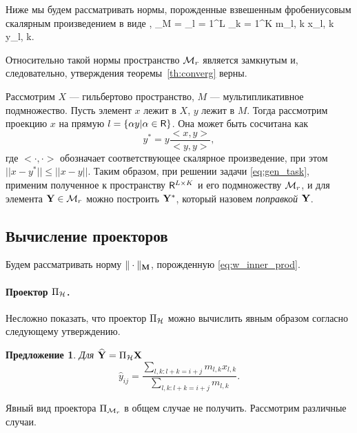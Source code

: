 \documentclass[12pt,a4paper,fleqn,leqno]{article}
\newtheorem{proposition}{Предложение}%
\begin{document}
Ниже мы будем рассматривать нормы, порожденные взвешенным фробениусовым скалярным произведением в виде
\be
\label{eq:w_inner_prod}
\langle\bfX, \bfY\rangle_M = \sum_{l = 1}^L \sum_{k = 1}^K m_{l, k} x_{l, k} y_{l, k}.
\ee

Относительно такой нормы пространство $\mathcal{M}_r$ является замкнутым и, следовательно, утверждения теоремы~\ref{th:converg} верны.

Рассмотрим $X$ --- гильбертово пространство, $M$ --- мультипликативное подмножество. Пусть элемент $x$ лежит в $X$, $y$ лежит в $M$. Тогда рассмотрим проекцию $x$ на прямую $l = \{\alpha y | \alpha \in \mathsf{R}\}$. Она может быть сосчитана как
\begin{equation*}
y^* = y \frac{<x, y>}{<y, y>},
\end{equation*}
где $<\cdot, \cdot>$ обозначает соответствующее скалярное произведение, при этом $||x - y^*|| \le ||x - y||$. Таким образом, при решении задачи \eqref{eq:gen_task}, применим полученное к пространству $\mathsf{R}^{L \times K}$ и его подмножеству $\mathcal{M}_r$, и для элемента $\mathbf{Y} \in \mathcal{M}_r$ можно построить $\mathbf{Y}^*$, который назовем \emph{поправкой $\mathbf{Y}$}.


\subsection{Вычисление проекторов}

Будем рассматривать норму $\|\cdot\|_{\mathbf{M}}$, порожденную \eqref{eq:w_inner_prod}.

\paragraph{Проектор $\Pi_{\mathcal{H}}$.} Несложно показать, что проектор $\Pi_{\mathcal{H}}$
можно вычислить явным образом согласно следующему утверждению.

\begin{proposition}
Для $\widehat{\mathbf{Y}}=\Pi_{\mathcal{H}} \mathbf{X}$
\begin{equation*}
\hat{y}_{ij} = \frac{\sum_{l,k: l+k=i+j} m_{l,k} x_{l,k}}{\sum_{l,k: l+k=i+j} m_{l,k}}.
\end{equation*}
\end{proposition}

Явный вид проектора $\Pi_{\mathcal{M}_r}$ в общем случае не получить.
Рассмотрим различные случаи.
\end{document}
